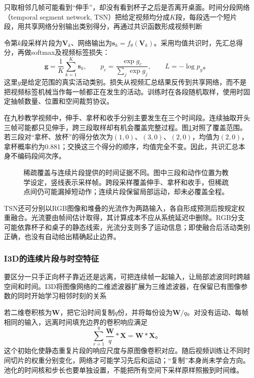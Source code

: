 只取相邻几帧可能看到“伸手”，却没有看到杯子之后是否离开桌面。时间分段网络（temporal segment network, TSN）把给定视频均分成$K$段，每段选一个短片段，用共享网络分别输出类别得分，再通过共识函数形成视频判断

令第$k$段采样片段为$\bm{V}_k$、网络输出为$\bm{s}_k=f_\theta(\bm{V}_k)$。采用均值共识时，先汇总得分，再做softmax及视频标签损失：
\begin{equation}
  \bm{g}=\frac{1}{K}\sum_{k=1}^{K}\bm{s}_k,\qquad
  p_c=\frac{\exp g_c}{\sum_j\exp g_j},\qquad
  L=-\log p_y\text{。}
  \label{eq:vision-video-tsn}
\end{equation}
这里$y$是给定范围的真实活动类别。损失从视频汇总结果反传到共享网络，而不是把视频标签机械当作每一帧都正在发生的活动。训练时在各段随机取样，使用时固定抽帧数量、位置和空间裁剪协议。

在九秒教学视频中，伸手、拿杯和收手分别主要发生在三个时间段。连续抽取开头三帧可能都只见伸手，跨三段取样却有机会覆盖完整过程。图\ref{fig:vision-temporal-sampling}对照了覆盖范围。若三段对“拿杯、放杯”的得分依次为$(1,0)$、$(3,0)$、$(2,0)$，均值为$(2,0)$，拿杯概率约为0.881；交换这三个得分的顺序，均值完全不变。因此，共识汇总本身不编码段间次序。

\begin{figure}[htbp]
  \centering
  
  \caption{稀疏覆盖与连续片段提供的时间证据不同。图中三段和动作位置为教学设定，竖线表示采样帧。跨段采样覆盖伸手、拿杯和收手，但稀疏点间仍可能漏掉短动作；连续片段保留局部运动，却未必覆盖全程。}
  \label{fig:vision-temporal-sampling}
\end{figure}

TSN还可分别以RGB图像和堆叠的光流作为两路输入，各自形成预测后按规定权重融合。光流要由帧间估计取得，其计算成本不应从系统延迟中删除。RGB分支可能依靠杯子和桌子的静态线索，光流分支则多了运动信息；即使融合后活动类别正确，也没有自动给出精确起止边界。

\subsubsection{I3D的连续片段与时空特征}
\label{sec:vision-video-i3d}

要区分一只手正向杯子靠近还是远离，可把连续帧一起输入，让局部滤波同时跨越空间和时间。I3D将图像网络的二维滤波器扩展为三维滤波器，在保留已有图像参数的同时开始学习相邻时刻的关系

若二维卷积核为$\bm{W}$，把它沿时间复制$q$份，并将每份设为$\bm{W}/q$。对没有运动、每帧相同的输入，远离时间填充边界的卷积响应满足
\begin{equation}
  \sum_{r=1}^{q}\frac{\bm{W}}{q}*\bm{X}
  =\bm{W}*\bm{X}\text{。}
  \label{eq:vision-video-inflation}
\end{equation}
这个初始化使静态重复片段的响应尺度与原图像卷积对应。随后视频训练让不同时间切片的权重分别变化，网络才可能学习先后和运动；“复制”本身尚未学会方向。池化的时间核和步长也要单独设置，不能把所有空间下采样原样照搬到时间维。

